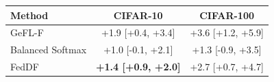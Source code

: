 \begin{tabular}{lcc}
\toprule
Method & CIFAR-10 & CIFAR-100\\
\midrule
GeFL-F & +1.9 [+0.4, +3.4] & +3.6 [+1.2, +5.9]\\
Balanced Softmax & +1.0 [-0.1, +2.1] & +1.3 [-0.9, +3.5]\\
FedDF & \textbf{+1.4 [+0.9, +2.0]} & +2.7 [+0.7, +4.7]\\
\bottomrule
\end{tabular}
